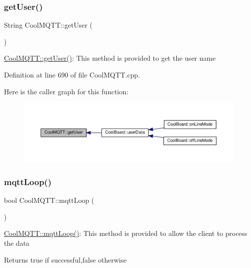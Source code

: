 \subsubsection{\texorpdfstring{get\+User()}{getUser()}}
{\footnotesize\ttfamily String Cool\+M\+Q\+T\+T\+::get\+User (\begin{DoxyParamCaption}{ }\end{DoxyParamCaption})}

\hyperlink{class_cool_m_q_t_t_a373cc92fca7760d886f02d8a6e5b3f63}{Cool\+M\+Q\+T\+T\+::get\+User()}\+: This method is provided to get the user name 

Definition at line 690 of file Cool\+M\+Q\+T\+T.\+cpp.

Here is the caller graph for this function\+:\nopagebreak
\begin{figure}[H]
\begin{center}
\leavevmode
\includegraphics[width=350pt]{class_cool_m_q_t_t_a373cc92fca7760d886f02d8a6e5b3f63_icgraph}
\end{center}
\end{figure}
\mbox{\label{class_cool_m_q_t_t_aa5eaae967b562b62cbcf2b8d81f6e5d5}} 
\subsubsection{\texorpdfstring{mqtt\+Loop()}{mqttLoop()}}
{\footnotesize\ttfamily bool Cool\+M\+Q\+T\+T\+::mqtt\+Loop (\begin{DoxyParamCaption}{ }\end{DoxyParamCaption})}

\hyperlink{class_cool_m_q_t_t_aa5eaae967b562b62cbcf2b8d81f6e5d5}{Cool\+M\+Q\+T\+T\+::mqtt\+Loop()}\+: This method is provided to allow the client to process the data

\begin{DoxyReturn}{Returns}
true if successful,false otherwise 
\end{DoxyReturn}



